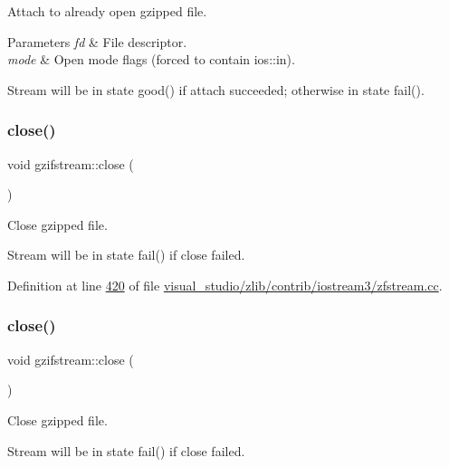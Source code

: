 Attach to already open gzipped file. 


\begin{DoxyParams}{Parameters}
{\em fd} & File descriptor. \\
\hline
{\em mode} & Open mode flags (forced to contain ios\+::in).\\
\hline
\end{DoxyParams}
Stream will be in state good() if attach succeeded; otherwise in state fail(). \mbox{\label{classgzifstream_a073fadd9dc90195c47a6ae2d863c8ace}} 
\subsubsection{\texorpdfstring{close()}{close()}\hspace{0.1cm}{\footnotesize\ttfamily [1/2]}}
{\footnotesize\ttfamily void gzifstream\+::close (\begin{DoxyParamCaption}{ }\end{DoxyParamCaption})}



Close gzipped file. 

Stream will be in state fail() if close failed. 

Definition at line \hyperlink{visual__studio_2zlib_2contrib_2iostream3_2zfstream_8cc_source_l00420}{420} of file \hyperlink{visual__studio_2zlib_2contrib_2iostream3_2zfstream_8cc_source}{visual\+\_\+studio/zlib/contrib/iostream3/zfstream.\+cc}.

\mbox{\label{classgzifstream_a073fadd9dc90195c47a6ae2d863c8ace}} 
\subsubsection{\texorpdfstring{close()}{close()}\hspace{0.1cm}{\footnotesize\ttfamily [2/2]}}
{\footnotesize\ttfamily void gzifstream\+::close (\begin{DoxyParamCaption}{ }\end{DoxyParamCaption})}



Close gzipped file. 

Stream will be in state fail() if close failed. \mbox{\label{classgzifstream_a8e9de13b311b698ef0ccc276b71c7941}} 
